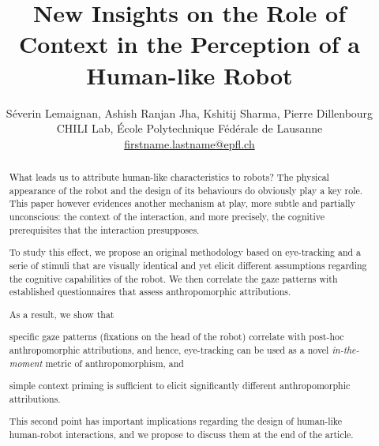 \documentclass[a4,twocolumn,10pt]{article}
\title{New Insights on the Role of Context in the Perception of a Human-like Robot}
\author{
Séverin Lemaignan, Ashish Ranjan Jha, Kshitij Sharma, Pierre Dillenbourg\\
CHILI Lab, École Polytechnique Fédérale de Lausanne\\
\url{firstname.lastname@epfl.ch}
}
\begin{document}
\maketitle
\begin{abstract}

What leads us to attribute human-like characteristics to robots? The physical
appearance of the robot and the design of its behaviours do obviously play a key
role. This paper however evidences another mechanism at play, more subtle and partially
unconscious: the context of the interaction, and more precisely, the cognitive
prerequisites that the interaction presupposes.

To study this effect, we propose an original methodology based on eye-tracking
and a serie of stimuli that are visually identical and yet elicit different
assumptions regarding the cognitive capabilities of the robot. We then correlate
the gaze patterns with established questionnaires that assess anthropomorphic
attributions.

\begin{inparaenum}
As a result, we show that \item specific gaze patterns (fixations on the head of
the robot) correlate with post-hoc anthropomorphic
attributions, and hence, eye-tracking can be used as a novel \emph{in-the-moment}
metric of anthropomorphism, and \item simple context priming is sufficient
to elicit significantly different anthropomorphic attributions.
\end{inparaenum}

This second point has important implications regarding the design of human-like human-robot
interactions, and we propose to discuss them at the end of the article.


\end{abstract}
\end{document}
